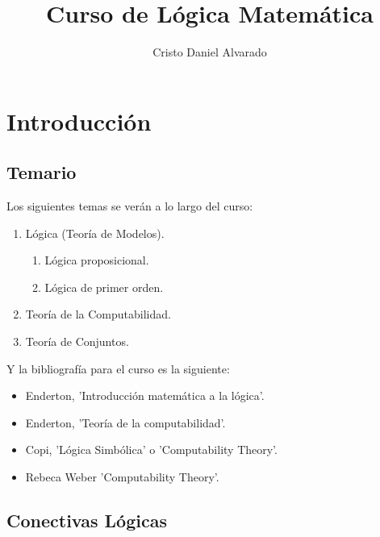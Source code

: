 \documentclass[12pt]{report}
\renewcommand{\theenumii}{\roman{enumii}}
\theoremstyle{largebreak}
\begin{document}
    \title{Curso de Lógica Matemática}
    \author{Cristo Daniel Alvarado}
    \maketitle

    \tableofcontents %

    \setcounter{chapter}{-1} %
    
    \chapter{Introducción}
    
    \section{Temario}
    

    Los siguientes temas se verán a lo largo del curso:

    \renewcommand{\theenumii}{\arabic{enumi}.\arabic{enumii}}

    \begin{enumerate}
        \item Lógica (Teoría de Modelos).
        \begin{enumerate}
            \item Lógica proposicional.
            \item Lógica de primer orden.
        \end{enumerate}
        \item Teoría de la Computabilidad.
        \item Teoría de Conjuntos.
    \end{enumerate}

    Y la bibliografía para el curso es la siguiente:

    \begin{itemize}
        \item Enderton, 'Introducción matemática a la lógica'.
        \item  Enderton, 'Teoría de la computabilidad'.
        \item Copi, 'Lógica Simbólica' o 'Computability Theory'.
        \item Rebeca Weber 'Computability Theory'.
    \end{itemize}

    \section{Conectivas Lógicas}
\end{document}
